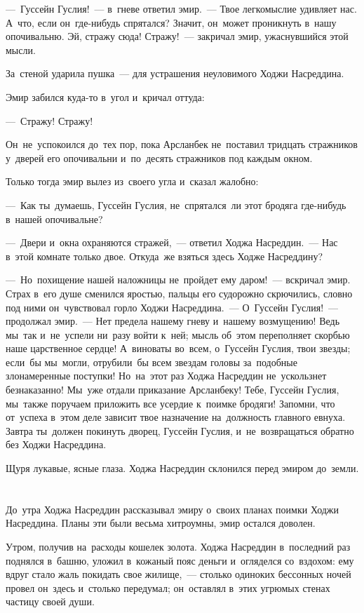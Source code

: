\documentclass[12pt,a4paper]{book}
\begin{document}
—~Гуссейн Гуслия!~— в~гневе ответил эмир.~— Твое легкомыслие удивляет нас. А~что, если он~где-нибудь спрятался? Значит, он~может проникнуть в~нашу опочивальню. Эй, стражу сюда! Стражу!~— закричал эмир, ужаснувшийся этой мысли.

За~стеной ударила пушка~— для устрашения неуловимого Ходжи Насреддина.

Эмир забился куда-то в~угол и~кричал оттуда:

—~Стражу! Стражу!

Он~не~успокоился до~тех пор, пока Арсланбек не~поставил тридцать стражников у~дверей его опочивальни и~по~десять стражников под каждым окном.

Только тогда эмир вылез из~своего угла и~сказал жалобно:

—~Как ты~думаешь, Гуссейн Гуслия, не~спрятался~ли этот бродяга где-нибудь в~нашей опочивальне?

—~Двери и~окна охраняются стражей,~— ответил Ходжа Насреддин.~— Нас в~этой комнате только двое. Откуда~же взяться здесь Ходже Насреддину?

—~Но~похищение нашей наложницы не~пройдет ему даром!~— вскричал эмир. Страх в~его душе сменился яростью, пальцы его судорожно скрючились, словно под ними он~чувствовал горло Ходжи Насреддина.~— О~Гуссейн Гуслия!~— продолжал эмир.~— Нет предела нашему гневу и~нашему возмущению! Ведь мы~так и~не~успели ни~разу войти к~ней; мысль об~этом переполняет скорбью наше царственное сердце! А~виноваты во~всем, о~Гуссейн Гуслия, твои звезды; если~бы мы~могли, отрубили~бы всем звездам головы за~подобные злонамеренные поступки! Но~на~этот раз Ходжа Насреддин не~ускользнет безнаказанно! Мы~уже отдали приказание Арсланбеку! Тебе, Гуссейн Гуслия, мы~также поручаем приложить все усердие к~поимке бродяги! Запомни, что от~успеха в~этом деле зависит твое назначение на~должность главного евнуха. Завтра ты~должен покинуть дворец, Гуссейн Гуслия, и~не~возвращаться обратно без Ходжи Насреддина.

Щуря лукавые, ясные глаза. Ходжа Насреддин склонился перед эмиром до~земли.


\chapter{}

До~утра Ходжа Насреддин рассказывал эмиру о~своих планах поимки Ходжи Насреддина. Планы эти были весьма хитроумны, эмир остался доволен.

Утром, получив на~расходы кошелек золота. Ходжа Насреддин в~последний раз поднялся в~башню, уложил в~кожаный пояс деньги и~огляделся со~вздохом: ему вдруг стало жаль покидать свое жилище,~— столько одиноких бессонных ночей провел он~здесь и~столько передумал; он~оставлял в~этих угрюмых стенах частицу своей души.
\end{document}
